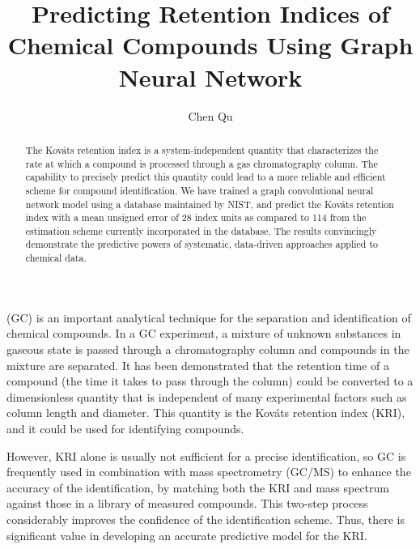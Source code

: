 \documentclass{IEEEcsmag}
\newcommand*{\kovats}{Kov\'ats\xspace}
\begin{document}

\title{Predicting Retention Indices of Chemical Compounds Using Graph Neural Network}

\author{Chen Qu}



\begin{abstract}
The \kovats retention index is a system-independent quantity that characterizes the rate at which a compound is processed through a gas chromatography column. The capability to precisely predict this quantity could lead to a more reliable and efficient scheme for compound identification. We have trained a graph convolutional neural network model using a database maintained by NIST, and predict the \kovats retention index with a mean unsigned error of 28 index units as compared to 114 from the estimation scheme currently incorporated in the database. The results convincingly demonstrate the predictive powers of systematic, data-driven approaches applied to chemical data.
\end{abstract}

\maketitle

 (GC) is an important analytical technique for the separation and identification of chemical compounds. In a GC experiment, a mixture of unknown substances in gaseous state is passed through a chromatography column and compounds in the mixture are separated. It has been demonstrated\cite{1958Kovats} that the retention time of a compound (the time it takes to pass through the column) could be converted to a dimensionless quantity that is independent of many experimental factors such as column length and diameter. This quantity is the \kovats retention index (KRI), and it could be used for identifying compounds.

However, KRI alone is usually not sufficient for a precise identification, so GC is frequently used in combination with mass spectrometry (GC/MS) to enhance the accuracy of the identification, by matching both the KRI and mass spectrum against those in a library of measured compounds. This two-step process considerably improves the confidence of the identification scheme.
Thus, there is significant value in developing an accurate predictive model for the KRI.
\end{document}
